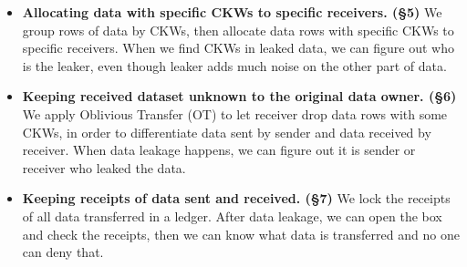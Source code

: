 \begin{itemize}
\item \textbf{Allocating data with specific CKWs to specific receivers. (\S5)} We group rows of data by CKWs, then allocate data rows with specific CKWs to specific receivers. When we find CKWs in leaked data, we can figure out who is the leaker, even though leaker adds much noise on the other part of data.

\item \textbf{Keeping received dataset unknown to the original data owner. (\S6)} We apply Oblivious Transfer (OT) to let receiver drop data rows with some CKWs, in order to differentiate data sent by sender and data received by receiver. When data leakage happens, we can figure out it is sender or receiver who leaked the data.

\item \textbf{Keeping receipts of data sent and received. (\S7)} We lock the receipts of all data transferred in a ledger. After data leakage, we can open the box and check the receipts, then we can know what data is transferred and no one can deny that.
\end{itemize}
